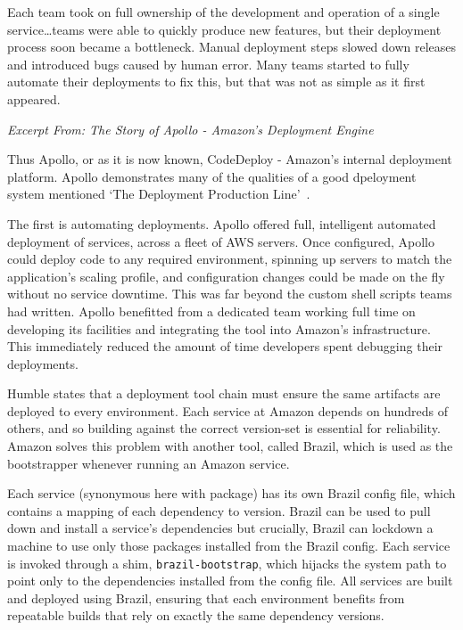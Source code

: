 \documentclass[11pt]{article}
\begin{document}
\begin{displayquote}

  Each team took on full ownership of the development and operation of a single
  service\dots teams were able to quickly produce new features, but their deployment
  process soon became a bottleneck. Manual deployment steps slowed down releases
  and introduced bugs caused by human error. Many teams started to fully
  automate their deployments to fix this, but that was not as simple as it first
  appeared.

  \textit{Excerpt From: The Story of Apollo - Amazon's Deployment
  Engine~\cite{theStoryOfApollo}}

\end{displayquote}

Thus Apollo, or as it is now known, CodeDeploy - Amazon's internal deployment
platform. Apollo demonstrates many of the qualities of a good dpeloyment system 
mentioned `The Deployment Production Line'~\cite{deploymentProductionLine}.

The first is automating deployments. Apollo offered full, intelligent automated 
deployment of services, across a fleet of AWS servers. Once configured, Apollo 
could deploy code to any required environment, spinning up servers to match the 
application's scaling profile, and configuration changes could be made on the 
fly without no service downtime.
This was far beyond the custom shell scripts teams had written. 
Apollo benefitted from a dedicated team working full time on developing its 
facilities and integrating the tool into Amazon's infrastructure. 
This immediately reduced the amount of time developers spent debugging their 
deployments.

Humble states that a deployment tool chain must ensure the same artifacts
are deployed to every environment. Each service at Amazon depends on hundreds of
others, and so building against the correct version-set is essential for
reliability. Amazon solves this problem with another tool, called Brazil, which
is used as the bootstrapper whenever running an Amazon service.

Each service (synonymous here with package) has its own Brazil config file,
which contains a mapping of each dependency to version. Brazil can be used to
pull down and install a service's dependencies but crucially, Brazil can
lockdown a machine to use only those packages installed from the Brazil config.
Each service is invoked through a shim, \texttt{brazil-bootstrap}, which hijacks
the system path to point only to the dependencies installed from the config
file.  All services are built and deployed using Brazil, ensuring that each
environment benefits from repeatable builds that rely on exactly the same
dependency versions.
\end{document}
